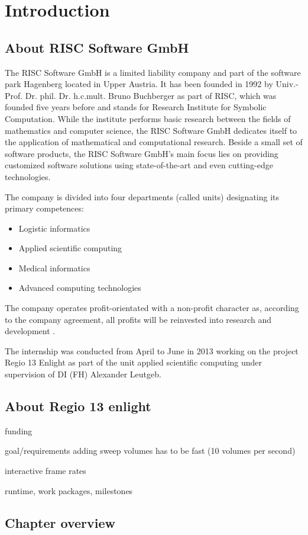 \section{Introduction}

\subsection{About RISC Software GmbH}

The RISC Software GmbH is a limited liability company and part of the software park Hagenberg located in Upper Austria. It has been founded in 1992 by Univ.-Prof. Dr. phil. Dr. h.c.mult. Bruno Buchberger as part of RISC, which was founded five years before and stands for Research Institute for Symbolic Computation. While the institute performs basic research between the fields of mathematics and computer science, the RISC Software GmbH dedicates itself to the application of mathematical and computational research. Beside a small set of software products, the RISC Software GmbH's main focus lies on providing customized software solutions using state-of-the-art and even cutting-edge technologies.

The company is divided into four departments (called units) designating its primary competences:

\begin{itemize}
	\item Logistic informatics
	\item Applied scientific computing
	\item Medical informatics
	\item Advanced computing technologies
\end{itemize}

The company operates profit-orientated with a non-profit character as, according to the company agreement, all profits will be reinvested into research and development \cite{risc_website}.

The internship was conducted from April to June in 2013 working on the project Regio 13 Enlight as part of the unit applied scientific computing under supervision of DI (FH) Alexander Leutgeb.


\subsection{About Regio 13 enlight}

funding

goal/requirements
	adding sweep volumes has to be fast (10 volumes per second)
	
	interactive frame rates

runtime, work packages, milestones



\subsection{Chapter overview}


